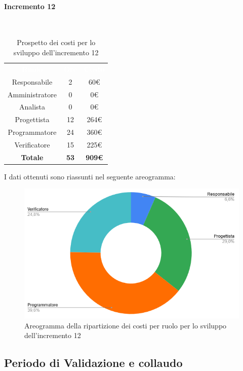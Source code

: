 \paragraph*{Incremento 12}\mbox{} \\
\begin{table}[H]
\centering\renewcommand{\arraystretch}{1.5}
\caption{Prospetto dei costi per lo sviluppo dell'incremento 12}
\vspace{0.2cm}
\begin{tabular}{ c c c }
\rowcolor{redafk}
\textcolor{white}{\textbf{Ruolo}} & \textcolor{white}{\textbf{Ore}} &
\textcolor{white}{\textbf{Costo}}  \\
Responsabile & 2 & 60€ \\
Amministratore & 0 & 0€ \\
Analista & 0 & 0€ \\
Progettista & 12 & 264€ \\
Programmatore & 24 & 360€  \\
Verificatore & 15 & 225€  \\
\rowcolor{lastrowcolor}
\textbf{Totale} & \textbf{53} & \textbf{909€}  \\
\end{tabular}
\end{table}
 
I dati ottenuti sono riassunti nel seguente areogramma:
\begin{figure}[H]
\centering
\includegraphics[scale=0.60]{img/grafici/torta_inc12.png}
\caption{Areogramma della ripartizione dei costi per ruolo per lo sviluppo dell'incremento 12}
\end{figure}


\subsection{Periodo di Validazione e collaudo}
